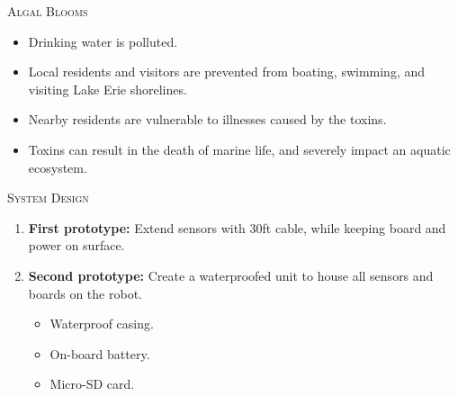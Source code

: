 \documentclass[final,t]{beamer}
\begin{document}
\begin{frame}{}
\begin{columns}
\begin{column}{.5\linewidth}
\begin{block}{\textsc{Algal Blooms}}
                \begin{itemize}
               		\item Drinking water is polluted.
					\item Local residents and visitors are prevented from boating, swimming, and visiting Lake Erie shorelines.
					\item Nearby residents are vulnerable to illnesses caused by the toxins.
					\item Toxins can result in the death of marine life, and severely impact an aquatic ecosystem.
				\end{itemize}
                    \vspace*{6mm}
                \end{block}
                \begin{block}{\textsc{System Design}}
                    \vspace*{6mm}

                    \begin{enumerate}
    	                \item \textbf{First prototype:}
                    	Extend sensors with 30ft cable, while keeping board and power on surface.
						\item \textbf{Second prototype:} Create a waterproofed unit to house all sensors and boards on the robot.
						\begin{itemize}
							\item Waterproof casing.
							\item On-board battery.
							\item Micro-SD card.
						\end{itemize}
					\end{enumerate}



\end{block}
\end{column}
\end{columns}
\end{frame}
\end{document}
